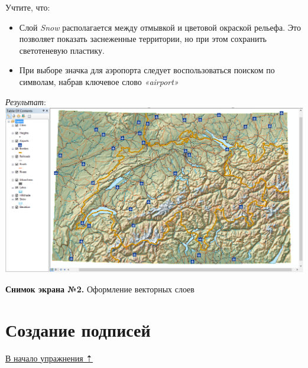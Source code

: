 \documentclass[]{book}
\theoremstyle{definition}
\theoremstyle{definition}
\theoremstyle{definition}
\theoremstyle{remark}
\begin{document}
Учтите, что:

\begin{itemize}
\item
  Слой \emph{Snow} располагается между отмывкой и цветовой окраской
  рельефа. Это позволяет показать заснеженные территории, но при этом
  сохранить светотеневую пластику.
\item
  При выборе значка для аэропорта следует воспользоваться поиском по
  символам, набрав ключевое слово \emph{«airport»}
\end{itemize}

\emph{Результат}: \includegraphics{images/Ex02/image15.png}

\textbf{Снимок экрана №2.} Оформление векторных слоев

\hypertarget{map-design-general-labels}{%
\section{Создание подписей}\label{map-design-general-labels}}

\protect\hyperlink{map-design-general}{В начало упражнения ⇡}
\end{document}
